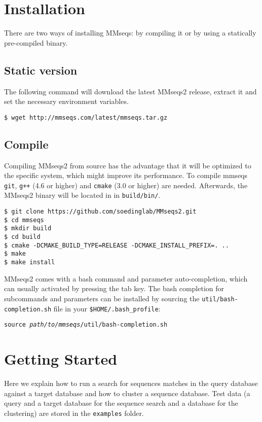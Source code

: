 \documentclass[11pt,a4paper]{scrreprt}
\begin{document}
\clearpage


\section{Installation}


There are two ways of installing MMseqs: by compiling it or by using a statically pre-compiled binary. 
\subsection{Static version}
The following command will download the latest MMseqs2 release, extract it and set the necessary environment variables.


\begin{verbatim}
$ wget http://mmseqs.com/latest/mmseqs.tar.gz
\end{verbatim}
\subsection{Compile}
Compiling MMseqs2 from source has the advantage that it will be optimized to the specific system, which might improve its performance. To compile mmseqs \texttt{git}, \texttt{g++} (4.6 or higher) and \texttt{cmake} (3.0 or higher) are needed. Afterwards, the MMseqs2 binary will be located in in \texttt{build/bin/}.


\begin{verbatim}
$ git clone https://github.com/soedinglab/MMseqs2.git
$ cd mmseqs
$ mkdir build
$ cd build
$ cmake -DCMAKE_BUILD_TYPE=RELEASE -DCMAKE_INSTALL_PREFIX=. ..
$ make 
$ make install 
\end{verbatim}


MMseqs2 comes with a bash command and parameter auto-completion, which can usually activated by pressing the tab key. The bash completion for subcommands and parameters can be installed by sourcing the \texttt{util/bash-completion.sh} file in your \texttt{\$HOME/.bash\_profile}:
\begin{flushleft}
\texttt{source \textit{path/to/mmseqs}/util/bash-completion.sh}
\end{flushleft}
\section{Getting Started}
Here we explain how to run a search for sequences matches in the query database against a target database and how to cluster a sequence database. Test data (a query and a target database for the sequence search and a database for the clustering) are stored in the \texttt{examples} folder.
\end{document}
